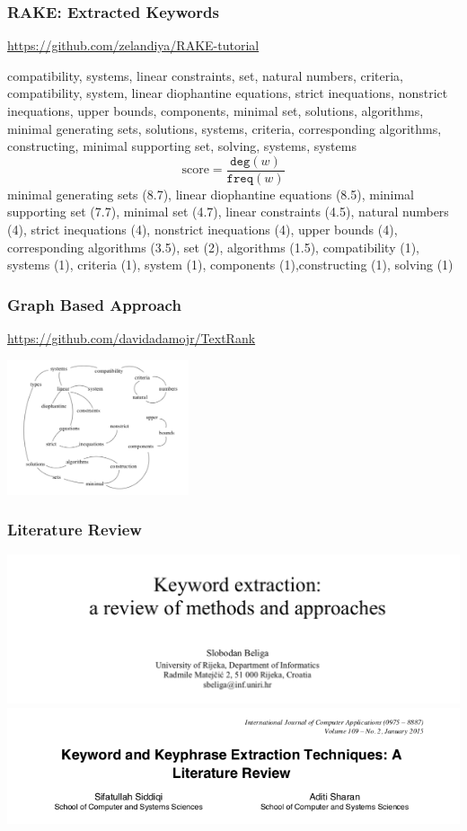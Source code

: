 \documentclass{beamer}
\begin{document}
\begin{frame}
\frametitle{RAKE: Extracted Keywords}

\url{https://github.com/zelandiya/RAKE-tutorial}

\vspace{0.1in}
compatibility, systems, linear constraints, set, natural numbers, criteria, compatibility, system, linear diophantine equations, strict inequations, nonstrict inequations, upper bounds, components, minimal set, solutions, algorithms, minimal generating sets, solutions, systems, criteria, corresponding algorithms, constructing, minimal supporting set, solving, systems, systems
\pause
\[
\text{score} = \frac{\texttt{deg}(w)}{\texttt{freq}(w)}
\]
\pause
minimal generating sets (8.7), linear diophantine equations (8.5), minimal supporting set (7.7), minimal set (4.7), linear constraints (4.5), natural numbers (4), strict inequations (4), nonstrict inequations (4), upper bounds (4), corresponding algorithms (3.5), set (2), algorithms (1.5), compatibility (1), systems (1), criteria (1), system (1), components (1),constructing (1), solving (1)
\vspace{1in}


\end{frame}

\begin{frame}
\frametitle{Graph Based Approach}

\url{https://github.com/davidadamojr/TextRank}

\vspace{0.1in}

\includegraphics[width= 0.4\textwidth]{img/graph}
\end{frame}


\begin{frame}
\frametitle{Literature Review}
\includegraphics[width= 1\textwidth]{img/lit_review}
\vspace{0.2in}
\includegraphics[width= 1\textwidth]{img/lit_review2}
\end{frame}
\end{document}
